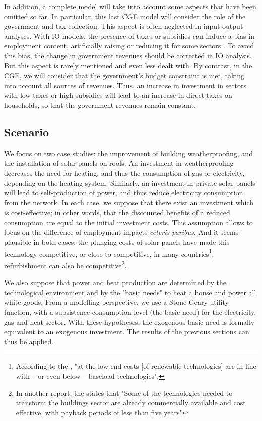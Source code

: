 In addition, a complete model will take into account some aspects that have been omitted so far. In particular, this last CGE model will consider the role of the government and tax collection. This aspect is often neglected in input-output analyses. With IO models, the presence of taxes or subsidies can induce a bias in employment content, artificially raising or reducing it for some sectors \citep{Perrier2017}.
To avoid this bias, the change in government revenues should be corrected in IO analysis. But this aspect is rarely mentioned and even less dealt with.
By contrast, in the CGE, we will consider that the government's budget constraint is met, taking into account all sources of revenues. 
Thus, an increase in investment in sectors with low taxes or high subsidies will lead to an increase in direct taxes on households, so that the government revenues remain constant.


\subsection{Scenario}
We focus on two case studies: the improvement of building weatherproofing, and the installation of solar panels on roofs. 
An investment in weatherproofing decreases the need for heating, and thus the consumption of gas or electricity, depending on the heating system. Similarly, an investment in private solar panels will lead to self-production of power, and thus reduce electricity consumption from the network. 
In each case, we suppose that there exist an investment which is cost-effective; in other words, that the discounted benefits of a reduced consumption are equal to the initial investment costs. This assumption allows to focus on the difference of employment impacts \textit{ceteris paribus}. And it seems plausible in both cases: the plunging costs of solar panels have made this technology competitive, or close to competitive, in many countries\footnote{According to the \citet{InternationalEnergyAgency2015}, "at the low-end costs [of renewable technologies] are in line with – or even below – baseload technologies".}; refurbishment can also be competitive\footnote{In another report, the \citet{InternationalEnergyAgency2013} states that "Some of the technologies needed to transform the buildings sector are already commercially available and cost effective, with payback periods of less than five years"}.

We also suppose that power and heat production are determined by the technological environment and by the "basic needs" to heat a house and power all white goods. From a modelling perspective, we use a Stone-Geary utility function, with a subsistence consumption level (the basic need) for the electricity, gas and heat sector.
With these hypotheses, the exogenous basic need is formally equivalent to an exogenous investment. The results of the previous sections can thus be applied.

